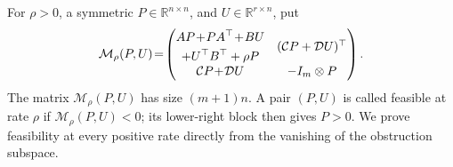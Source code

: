 \documentclass[twocolumn]{autart}
\begin{document}
For $\rho>0$, a symmetric $P\in\mathbb R^{n\times n}$, and
$U\in\mathbb R^{r\times n}$, put\vspace{-2mm}
\begin{equation}\label{eq:lmi}
\mathcal M_\rho(P,U)\!=\!
\begin{pmatrix}
\begin{gathered}AP\!+\!PA^{\top}\!+\!BU\\+U^{\top}B^{\top}+\rho P\end{gathered} & (\mathcal CP+\mathcal DU)^\top\\
\mathcal CP\!+\!\mathcal DU & -I_m\otimes P
\end{pmatrix}.\vspace{-2mm}
\end{equation}
The matrix $\mathcal M_\rho(P,U)$ has size $(m+1)n$. A pair $(P,U)$
is called feasible at rate $\rho$ if $\mathcal M_\rho(P,U)<0$; its
lower-right block then gives $P>0$. We prove feasibility at every positive
rate directly from the vanishing of the obstruction subspace.
\end{document}
